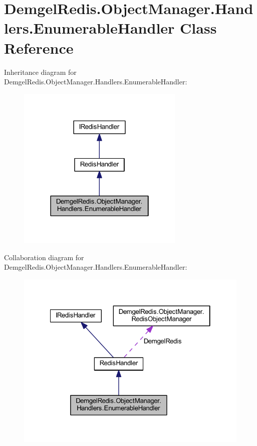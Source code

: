 \hypertarget{class_demgel_redis_1_1_object_manager_1_1_handlers_1_1_enumerable_handler}{}\section{Demgel\+Redis.\+Object\+Manager.\+Handlers.\+Enumerable\+Handler Class Reference}
\label{class_demgel_redis_1_1_object_manager_1_1_handlers_1_1_enumerable_handler}


Inheritance diagram for Demgel\+Redis.\+Object\+Manager.\+Handlers.\+Enumerable\+Handler\+:
\nopagebreak
\begin{figure}[H]
\begin{center}
\leavevmode
\includegraphics[width=226pt]{class_demgel_redis_1_1_object_manager_1_1_handlers_1_1_enumerable_handler__inherit__graph}
\end{center}
\end{figure}


Collaboration diagram for Demgel\+Redis.\+Object\+Manager.\+Handlers.\+Enumerable\+Handler\+:
\nopagebreak
\begin{figure}[H]
\begin{center}
\leavevmode
\includegraphics[width=322pt]{class_demgel_redis_1_1_object_manager_1_1_handlers_1_1_enumerable_handler__coll__graph}
\end{center}
\end{figure}
